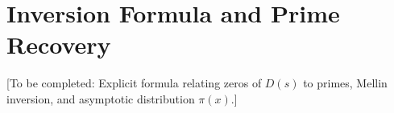 \section{Inversion Formula and Prime Recovery}

[To be completed: Explicit formula relating zeros of $D(s)$ to primes, Mellin inversion, and asymptotic distribution $\pi(x)$.]

